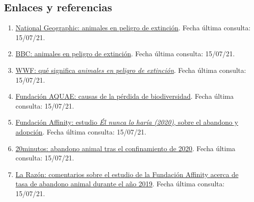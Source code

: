 \documentclass[12pt]{article}
\begin{document}
	   \subsection*{Enlaces y referencias}
		\begin{enumerate}
			\item 
			\label{bib: enlace National Geographic} \href{https://www.nationalgeographic.com.es/naturaleza/grandes-reportajes/animales-peligro-extincion_12536}{National Geographic: animales en peligro de extinción}. Fecha última consulta: 15/07/21.
			
			\item 
			\label{bib: enlace BBC}
			\href{https://www.bbc.com/mundo/noticias-54036796}{BBC: animales en peligro de extinción}. Fecha última consulta: 15/07/21.
			
			\item 
			\label{bib: enlace WWF}
			\href{https://www.worldwildlife.org/descubre-wwf/historias/que-significa-especie-en-peligro-de-extincion}{WWF: qué significa \textit{animales en peligro de extinción}}. Fecha última consulta: 15/07/21.
			
			\item
			\label{bib: enlace Fundación AQUAE}
			\href{https://www.fundacionaquae.org/causas-perdida-biodiversidad/}{Fundación AQUAE: causas de la pérdida de biodiversidad}. Fecha última consulta: 15/07/21.
			
			\item
			\label{bib: enlace Fundación Affinity} \href{https://www.fundacion-affinity.org/observatorio/infografia-el-nunca-lo-haria-estudio-de-abandono-y-adopcion-2020}{Fundación Affinity: estudio \textit{Él nunca lo haría (2020)}, sobre el abandono y adopción}. Fecha última consulta: 15/07/21.
			
			\item
			\label{bib: enlace 20 minutos} \href{https://www.20minutos.es/noticia/4318383/0/el-abandono-animal-en-espana-aumenta-un-25-en-las-ultimas-semanas/}{20minutos: abandono animal tras el confinamiento de 2020}. Fecha última consulta: 15/07/21.
			
			\item
			\label{bib: enlace La Razón} \href{https://www.larazon.es/medio-ambiente/20201118/qxv6yuokargfbnjvknn6bhm4ze.html}{La Razón: comentarios sobre el estudio de la Fundación Affinity acerca de tasa de abandono animal durante el año 2019}. Fecha última consulta: 15/07/21.
			

\end{enumerate}
\end{document}
